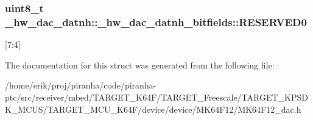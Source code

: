 \subsubsection[{\texorpdfstring{R\+E\+S\+E\+R\+V\+E\+D0}{RESERVED0}}]{\setlength{\rightskip}{0pt plus 5cm}uint8\+\_\+t \+\_\+hw\+\_\+dac\+\_\+datnh\+::\+\_\+hw\+\_\+dac\+\_\+datnh\+\_\+bitfields\+::\+R\+E\+S\+E\+R\+V\+E\+D0}\hypertarget{struct__hw__dac__datnh_1_1__hw__dac__datnh__bitfields_aaaf96481cd413c05fcbf94a83276c03a}{}\label{struct__hw__dac__datnh_1_1__hw__dac__datnh__bitfields_aaaf96481cd413c05fcbf94a83276c03a}
\mbox{[}7\+:4\mbox{]} 

The documentation for this struct was generated from the following file\+:\begin{DoxyCompactItemize}
\item 
/home/erik/proj/piranha/code/piranha-\/ptc/src/receiver/mbed/\+T\+A\+R\+G\+E\+T\+\_\+\+K64\+F/\+T\+A\+R\+G\+E\+T\+\_\+\+Freescale/\+T\+A\+R\+G\+E\+T\+\_\+\+K\+P\+S\+D\+K\+\_\+\+M\+C\+U\+S/\+T\+A\+R\+G\+E\+T\+\_\+\+M\+C\+U\+\_\+\+K64\+F/device/device/\+M\+K64\+F12/M\+K64\+F12\+\_\+dac.\+h\end{DoxyCompactItemize}
